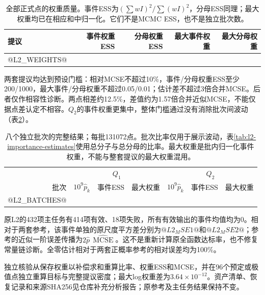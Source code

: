 \begin{table}[htbp]\centering\small
\begin{tabular}{lrrrr}\toprule
提议 & 事件权重ESS & 分母权重ESS & 最大事件权重 & 最大分母权重\\\midrule
@L2_WEIGHTS@
\bottomrule\end{tabular}
\caption{全部正式点的权重质量。事件ESS为$(\sum wI)^2/\sum(wI)^2$，分母ESS同理；最大权重均已在相应和中归一化。它们不是MCMC ESS，也不是独立批次数。}
\label{tab:l2-importance-weights}
\end{table}

两套提议均达到预设门槛：相对MCSE不超过10\%，事件/分母权重ESS至少200/1000，最大事件/分母权重不超过0.05/0.01；估计差不超过3倍合并MCSE。后者仅作相容性诊断。两点相差约12.5\%，差值约为1.57倍合并近似MCSE，不能仅据点差认定不相容。$Q_2$的事件权重更集中，整体门槛通过没有消除批次间波动（表\ref{tab:l2-importance-batches}）。

\begin{table}[htbp]\centering\small
\begin{tabular}{rrrrrrr}\toprule
& \multicolumn{3}{c}{$Q_1$} & \multicolumn{3}{c}{$Q_2$}\\
批次 & $10^9\widehat p_k$ & 事件ESS & 最大权重 & $10^9\widehat p_k$ & 事件ESS & 最大权重\\\midrule
@L2_BATCHES@
\bottomrule\end{tabular}
\caption{八个独立批次的完整结果；每批131072点。批次比率仅用于展示波动，表\ref{tab:l2-importance-estimates}使用总分子与总分母的比率。最大权重是批内归一化事件权重，不能与整套提议的最大权重混用。}
\label{tab:l2-importance-batches}
\end{table}

原L2的432项主任务有414项有效、18项失败，所有有效输出的事件均值均为0。相对于两套参考，该事件单独的原尺度平方差分别为$@L2_MSE1@$和$@L2_MSE2@$；参考的近似一阶误差传播为$2\widehat p\,\widehat{\operatorname{MCSE}}$。这不是重新计算原全函数达标率，也不修复常量链诊断。全零估计相对于两套正概率参考的相对误差均为100\%。

独立核验从保存权重以补偿求和重算比率、权重ESS和MCSE，并在96个预定或极值点独立重算目标与完整提议密度；最大log权重差为$3.64\times10^{-12}$。资产清单、恢复记录和来源SHA256见仓库补充分析报告；原参考及主任务结果保持不变。
